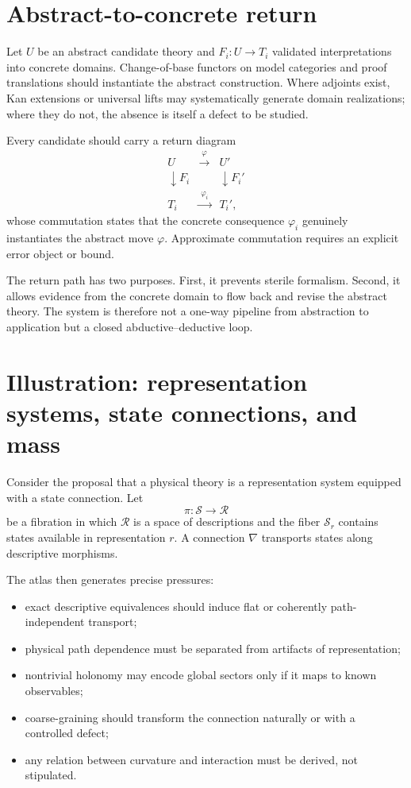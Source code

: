 \documentclass[11pt]{article}
\begin{document}
\section{Abstract-to-concrete return}

Let $U$ be an abstract candidate theory and $F_i:U\to T_i$ validated interpretations into concrete
domains. Change-of-base functors on model categories and proof translations should instantiate the
abstract construction. Where adjoints exist, Kan extensions or universal lifts may systematically
generate domain realizations; where they do not, the absence is itself a defect to be studied.

Every candidate should carry a return diagram
\begin{equation}
\begin{array}{ccc}
U & \xrightarrow{\;\varphi\;} & U' \\
\downarrow F_i && \downarrow F_i' \\
T_i & \xrightarrow{\;\varphi_i\;} & T_i',
\end{array}
\end{equation}
whose commutation states that the concrete consequence $\varphi_i$ genuinely instantiates the
abstract move $\varphi$. Approximate commutation requires an explicit error object or bound.

The return path has two purposes. First, it prevents sterile formalism. Second, it allows evidence from
the concrete domain to flow back and revise the abstract theory. The system is therefore not a one-way
pipeline from abstraction to application but a closed abductive--deductive loop.

\section{Illustration: representation systems, state connections, and mass}

Consider the proposal that a physical theory is a representation system equipped with a state
connection. Let
\begin{equation}
\pi:\mathcal{S}\longrightarrow\mathcal{R}
\end{equation}
be a fibration in which $\mathcal{R}$ is a space of descriptions and the fiber $\mathcal{S}_r$ contains
states available in representation $r$. A connection $\nabla$ transports states along descriptive
morphisms.

The atlas then generates precise pressures:
\begin{itemize}
  \item exact descriptive equivalences should induce flat or coherently path-independent transport;
  \item physical path dependence must be separated from artifacts of representation;
  \item nontrivial holonomy may encode global sectors only if it maps to known observables;
  \item coarse-graining should transform the connection naturally or with a controlled defect;
  \item any relation between curvature and interaction must be derived, not stipulated.
\end{itemize}
\end{document}
